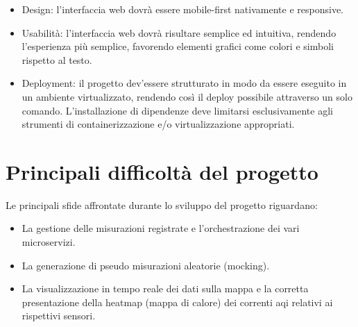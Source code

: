 \begin{itemize}
  \item Design: l'interfaccia web dovrà essere mobile-first nativamente e responsive.
  \item Usabilità: l'interfaccia web dovrà risultare semplice ed intuitiva, rendendo l'esperienza più semplice,
        favorendo elementi grafici come colori e simboli rispetto al testo.
  \item Deployment: il progetto dev'essere strutturato in modo da essere eseguito in un ambiente virtualizzato,
        rendendo così il deploy possibile attraverso un solo comando. L'installazione di dipendenze deve limitarsi
        esclusivamente agli strumenti di containerizzazione e/o virtualizzazione appropriati.
\end{itemize}

\section{Principali difficoltà del progetto}

Le principali sfide affrontate durante lo sviluppo del progetto riguardano:

\begin{itemize}
  \item La gestione delle misurazioni registrate e l'orchestrazione dei vari microservizi.
  \item La generazione di pseudo misurazioni aleatorie (mocking).
  \item La visualizzazione in tempo reale dei dati sulla mappa e la corretta presentazione della heatmap
        (mappa di calore) dei correnti \acrfull{aqi} relativi ai rispettivi sensori.
\end{itemize}
